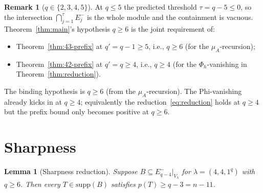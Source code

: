 \documentclass[11pt]{article}
\newtheorem{lemma}[theorem]{Lemma}
\theoremstyle{definition}
\newtheorem{remark}[theorem]{Remark}
\newcommand{\supp}{\mathrm{supp}}
\begin{document}
\begin{remark}[$q \in \{2, 3, 4, 5\}$]\label{rem:q-low}
At $q \le 5$ the predicted threshold $\tau = q - 5 \le 0$, so the
intersection $\bigcap_{j=1}^{\tau} E_j^-$ is the whole module and the
containment is vacuous.  Theorem~\ref{thm:main}'s hypothesis $q \ge 6$
is the joint requirement of:
\begin{itemize}[topsep=0.2em,itemsep=0.1em]
\item Theorem~\ref{thm:43-prefix} at $q' = q - 1 \ge 5$, i.e.,
$q \ge 6$ (for the $\mu_A$-recursion);
\item Theorem~\ref{thm:42-prefix} at $q' = q \ge 4$, i.e., $q \ge 4$
(for the $\Phi_h$-vanishing in Theorem~\ref{thm:reduction}).
\end{itemize}
The binding hypothesis is $q \ge 6$ (from the $\mu_A$-recursion).
The Phi-vanishing already kicks in at $q \ge 4$; equivalently the
reduction~\eqref{eq:reduction} holds at $q \ge 4$ but the prefix
bound only becomes positive at $q \ge 6$.
\end{remark}

\section{Sharpness}\label{sec:sharp}

\begin{lemma}[Sharpness reduction]\label{lem:sharp-reduction}
Suppose $B \subseteq E_{q-4}^-|_{V_\lambda}$ for $\lambda = (4, 4, 1^q)$
with $q \ge 6$.  Then every $T \in \supp(B)$ satisfies
$p(T) \ge q - 3 = n - 11$.
\end{lemma}
\end{document}
